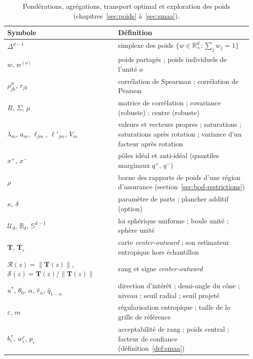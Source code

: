 \documentclass[11pt,a4paper]{article}
\theoremstyle{definition}
\theoremstyle{remark}
\newcommand{\R}{\mathbb{R}}
\newcommand{\Unif}{\mathcal{U}}
\newcommand{\Bball}{\mathbb{B}}
\newcommand{\Sphere}{\mathbb{S}}
\newcommand{\norm}[1]{\left\lVert #1 \right\rVert}
\newcommand{\simplex}{\Delta^{d-1}}
\newcommand{\Tmap}{\mathbf{T}}
\begin{document}
\begin{table}[htbp]
  \centering
  \small
  \renewcommand{\arraystretch}{1.2}
  \begin{tabularx}{\textwidth}{@{}l X@{}}
    \toprule
    \textbf{Symbole} & \textbf{Définition} \\
    \midrule
    $\simplex$ & simplexe des poids $\{w \in \R_+^d : \sum_j w_j = 1\}$ \\
    $w$, $w^{(o)}$ & poids partagés ; poids individuels de l'unité $o$ \\
    $\rho^S_{jk}$, $r_{jk}$ & corrélation de Spearman ; corrélation de Pearson \\
    $R$, $\Sigma$, $\mu$ & matrice de corrélation ; covariance (robuste) ; centre
      (robuste) \\
    $\lambda_m$, $a_m$, $\ell_{jm}$, $\ell'_{jm}$, $V_m$ & valeurs et vecteurs propres ;
      saturations ; saturations après rotation ; variance d'un facteur après rotation \\
    $x^+$, $x^-$ & pôles idéal et anti-idéal (quantiles marginaux $q^+$, $q^-$) \\
    $\rho$ & borne des rapports de poids d'une région d'assurance
      (section~\ref{sec:bod-restrictions}) \\
    $\kappa$, $\delta$ & paramètre de parts ; plancher additif (option) \\
    $\Unif_d$, $\Bball_d$, $\Sphere^{d-1}$ & loi sphérique uniforme ; boule unité ;
      sphère unité \\
    $\Tmap$, $\bar{\Tmap}_\varepsilon$ & carte \emph{center-outward} ; son estimateur
      entropique hors échantillon \\
    $\mathcal{R}(z) = \norm{\Tmap(z)}$, $\mathcal{S}(z) = \Tmap(z)/\norm{\Tmap(z)}$ &
      rang et signe \emph{center-outward} \\
    $u^*$, $\theta_0$, $\alpha$, $\hat{r}_\alpha$, $\hat{q}_{1-\alpha}$ & direction
      d'intérêt ; demi-angle du cône ; niveau ; seuil radial ; seuil projeté \\
    $\varepsilon$, $m$ & régularisation entropique ; taille de la grille de référence \\
    $b^{\,r}_i$, $w^c_i$, $p_i$ & acceptabilité de rang ; poids central ; facteur de
      confiance (définition~\ref{def:smaa}) \\
    \bottomrule
  \end{tabularx}
  \caption{Pondérations, agrégations, transport optimal et exploration des poids
  (chapitres~\ref{sec:poids} à~\ref{sec:smaa}).}
  \label{tab:notations-methodes}
\end{table}
\end{document}
